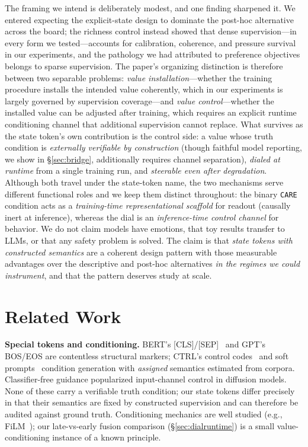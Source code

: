 \documentclass[manuscript, screen, review]{jair}
\newcommand{\care}{\texttt{CARE}}
\begin{document}
The framing we intend is deliberately modest, and one finding sharpened it. We entered expecting the explicit-state design to dominate the post-hoc alternative across the board; the richness control instead showed that dense supervision---in every form we tested---accounts for calibration, coherence, and pressure survival in our experiments, and the pathology we had attributed to preference objectives belongs to sparse supervision. The paper's organizing distinction is therefore between two separable problems: \emph{value installation}---whether the training procedure installs the intended value coherently, which in our experiments is largely governed by supervision coverage---and \emph{value control}---whether the installed value can be adjusted after training, which requires an explicit runtime conditioning channel that additional supervision cannot replace. What survives as the state token's own contribution is the control side: a value whose truth condition is \emph{externally verifiable by construction} (though faithful model reporting, we show in \S\ref{sec:bridge}, additionally requires channel separation), \emph{dialed at runtime} from a single training run, and \emph{steerable even after degradation}. Although both travel under the state-token name, the two mechanisms serve different functional roles and we keep them distinct throughout: the binary \care{} condition acts as a \emph{training-time representational scaffold} for readout (causally inert at inference), whereas the dial is an \emph{inference-time control channel} for behavior. We do not claim models have emotions, that toy results transfer to LLMs, or that any safety problem is solved. The claim is that \emph{state tokens with constructed semantics} are a coherent design pattern with those measurable advantages over the descriptive and post-hoc alternatives \emph{in the regimes we could instrument}, and that the pattern deserves study at scale.

\section{Related Work}
\label{sec:related}

\textbf{Special tokens and conditioning.} BERT's [CLS]/[SEP]~\citep{devlin2019bert} and GPT's BOS/EOS are contentless structural markers; CTRL's control codes~\citep{keskar2019ctrl} and soft prompts~\citep{lester2021power} condition generation with \emph{assigned} semantics estimated from corpora. Classifier-free guidance popularized input-channel control in diffusion models. None of these carry a verifiable truth condition; our state tokens differ precisely in that their semantics are fixed by constructed supervision and can therefore be audited against ground truth. Conditioning mechanics are well studied (e.g., FiLM~\citep{perez2018film}); our late-vs-early fusion comparison (\S\ref{sec:dialruntime}) is a small value-conditioning instance of a known principle.
\end{document}
